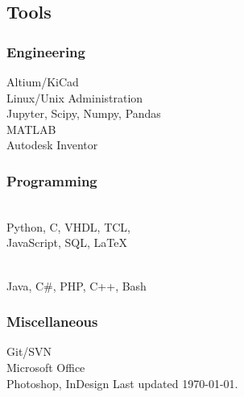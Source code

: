 \documentclass[]{resume}
\begin{document}
\begin{facts}
\subsection{Tools}

\subsubsection{Engineering}
Altium/KiCad\\
Linux/Unix Administration\\
Jupyter, Scipy, Numpy, Pandas\\
MATLAB\\
Autodesk Inventor
\sectionsep

\subsubsection{Programming}
\\
Python, C, VHDL, TCL,\\
JavaScript, SQL, LaTeX
\sectionsep

\\
Java, C\#, PHP, C++, Bash
\sectionsep

\subsubsection{Miscellaneous}
Git/SVN\\
Microsoft Office\\
Photoshop, InDesign
\vfill
Last updated \today.

\end{facts}%
\end{document}
